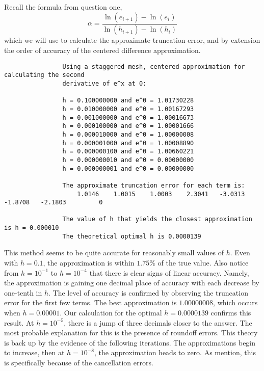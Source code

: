 \documentclass{article}
\begin{document}
\begin{enumerate}[label = \arabic*]
\begin{enumerate}
			\hspace{15pt} Recall the formula from question one, \[ \alpha = \frac{\ln(e_{i + 1}) - \ln(e_i)}{\ln(h_{i + 1}) - \ln(h_i)} \] which we will use to calculate the approximate truncation error, and by extension the order of accuracy of the centered difference approximation.
			
			
			
			\pagebreak
			
			\color{lightgray}
			\begin{verbatim}
				Using a staggered mesh, centered approximation for calculating the second
				derivative of e^x at 0:
				
				h = 0.100000000 and e^0 = 1.01730228
				h = 0.010000000 and e^0 = 1.00167293
				h = 0.001000000 and e^0 = 1.00016673
				h = 0.000100000 and e^0 = 1.00001666
				h = 0.000010000 and e^0 = 1.00000008
				h = 0.000001000 and e^0 = 1.00008890
				h = 0.000000100 and e^0 = 1.00660221
				h = 0.000000010 and e^0 = 0.00000000
				h = 0.000000001 and e^0 = 0.00000000
				
				The approximate truncation error for each term is:
				    1.0146    1.0015    1.0003    2.3041   -3.0313   -1.8708   -2.1803         0
				
				The value of h that yields the closest approximation is h = 0.000010
				The theoretical optimal h is 0.0000139
			\end{verbatim}
			\color{black}
			
			\hspace{15pt} This method seems to be quite accurate for reasonably small values of $h$. Even with $h = 0.1$, the approximation is within $1.75\%$ of the true value. Also notice from $h = 10^{-1}$ to $h = 10^{-4}$ that there is clear signs of linear accuracy. Namely, the approximation is gaining one decimal place of accuracy with each decrease by one-tenth in $h$. The level of accuracy is confirmed by observing the truncation error for the first few terms. The best approximation is $1.00000008$, which occurs when $h = 0.00001$. Our calculation for the optimal $h = 0.0000139$ confirms this result. At $h = 10^{-5}$, there is a jump of three decimals closer to the answer. The most probable explanation for this is the presence of roundoff errors. This theory is back up by the evidence of the following iterations. The approximations begin to increase, then at $h = 10^{-8}$, the approximation heads to zero. As mention, this is specifically because of the cancellation errors.
		\end{enumerate}
	\end{enumerate}
\end{document}
